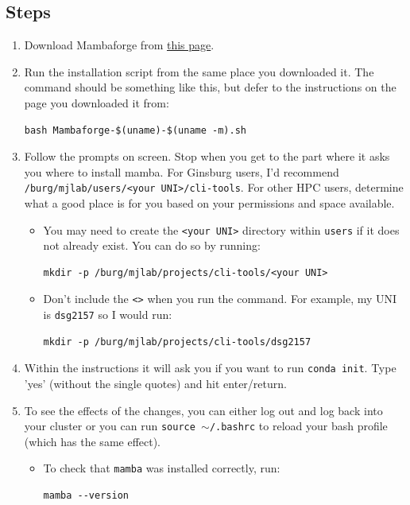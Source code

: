 \documentclass{article}
\begin{document}
    \subsection{Steps}
    \begin{enumerate}
        \item Download Mambaforge from \href{https://github.com/conda-forge/miniforge#install}{this page}.
        
        \item Run the installation script from the same place you downloaded it. The command should be something like this, but defer to the instructions on the page you downloaded it from:
        \begin{lstlisting}[style=bashstyle]
            bash Mambaforge-$(uname)-$(uname -m).sh
        \end{lstlisting}
        
        \item Follow the prompts on screen. Stop when you get to the part where it asks you where to install mamba. For Ginsburg users, I'd recommend \texttt{/burg/mjlab/users/<your UNI>/cli-tools}. For other HPC users, determine what a good place is for you based on your permissions and space available.
        \begin{itemize}
            \item You may need to create the \texttt{<your UNI>} directory within \texttt{users} if it does not already exist. You can do so by running:
            \begin{lstlisting}[style=bashstyle]
                mkdir -p /burg/mjlab/projects/cli-tools/<your UNI>
            \end{lstlisting}
            \item Don't include the \texttt{<>} when you run the command. For example, my UNI is \texttt{dsg2157} so I would run:
            \begin{lstlisting}[style=bashstyle]
                mkdir -p /burg/mjlab/projects/cli-tools/dsg2157
            \end{lstlisting}
        \end{itemize}
        
        \item Within the instructions it will ask you if you want to run \texttt{conda init}. Type 'yes' (without the single quotes) and hit enter/return.

        \item To see the effects of the changes, you can either log out and log back into your cluster or you can run \texttt{source $\sim$/.bashrc} to reload your bash profile (which has the same effect).
        \begin{itemize}
            \item To check that \texttt{mamba} was installed correctly, run:
            \begin{lstlisting}[style=bashstyle]
                mamba --version
            \end{lstlisting}


\end{itemize}
\end{enumerate}
\end{document}
